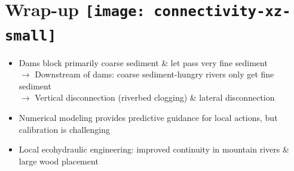 \section*{Wrap-up {\texttt{[image: connectivity-xz-small]}}}

{
%
\begin{frame}[plain]{}{\secname}
	\vspace{2.cm}
		\begin{tcolorbox}[colbacktitle=hellblau!80!black, colback=hellblau!10!white, fonttitle=\bfseries, standard jigsaw,colframe=blue_light, bottom=0mm, middle=0mm, boxsep=0.2mm, opacityframe=0.5, opacityfill=0.75, opacitybacktitle=0.75, title filled, title={\faGraduationCap\ Wrap-up (Conclusions)}, size=fbox]
			\vspace{0.25cm}
			\begin{itemize}			
				\item[\faChainBroken] Dams block primarily coarse sediment \& let pass very fine sediment\\
				$\rightarrow$ Downstream of dams: coarse sediment-hungry rivers only get fine sediment\\
				$\rightarrow$ Vertical disconnection (riverbed clogging) \& lateral disconnection \vspace{0.1cm}
				\item[\faLightbulbO] Numerical modeling provides predictive guidance for local actions, but calibration is challenging
				\item[\faLightbulbO] Local ecohydraulic engineering: improved continuity in mountain rivers \& large wood placement
			\end{itemize}
			\vspace{0.1cm}
		\end{tcolorbox}
		\smallskip
\end{frame}
}

